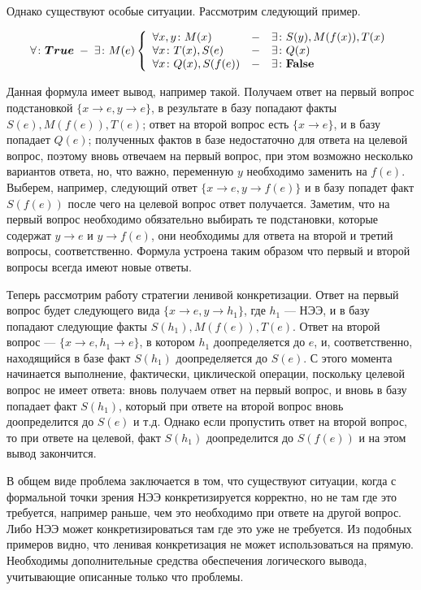 Однако существуют особые ситуации. Рассмотрим следующий пример.
\begin{example}[]\label{example:uhe1}
$$\forall\colon\boldsymbol{True} \; - \; \exists\colon M(e) \left\{
\begin{array}{lcl}
 \forall x,y\colon M(x) & - & \exists\colon S(y),M(f(x)),T(x) \\
 \forall x \colon T(x),S(e) & - & \exists\colon Q(x) \\
 \forall x \colon Q(x),S(f(e)) & - & \exists\colon\textbf{False}
\end{array}
\right.$$

Данная формула имеет вывод, например такой. Получаем ответ на первый вопрос подстановкой $\{ x\rightarrow e, y\rightarrow e \}$, в результате в базу попадают факты $S(e),M(f(e)),T(e)$; ответ на второй вопрос есть $\{ x \rightarrow e\}$, и в базу попадает $Q(e)$; полученных фактов в базе недостаточно для ответа на целевой вопрос, поэтому вновь отвечаем на первый вопрос, при этом возможно несколько вариантов ответа, но, что важно, переменную $y$ необходимо заменить на $f(e)$. Выберем, например, следующий ответ $\{x \rightarrow e, y \rightarrow f(e) \}$ и в базу попадет факт $S(f(e))$ после чего на целевой вопрос ответ получается. Заметим, что на первый вопрос необходимо обязательно выбирать те подстановки, которые содержат $y \rightarrow e$ и $y \rightarrow f(e)$, они необходимы для ответа на второй и третий вопросы, соответственно. Формула устроена таким образом что первый и второй вопросы всегда имеют новые ответы.

Теперь рассмотрим работу стратегии ленивой конкретизации. Ответ на первый вопрос будет следующего вида $\{ x\rightarrow e, y\rightarrow h_1 \}$, где $h_1$ --- НЭЭ, и в базу попадают следующие факты $S(h_1),M(f(e)),T(e)$. Ответ на второй вопрос --- $\{ x\rightarrow e, h_1\rightarrow e \}$, в котором $h_1$ доопределяется до $e$, и, соответственно, находящийся в базе факт $S(h_1)$ доопределяется до $S(e)$. С этого момента начинается выполнение, фактически, циклической операции, поскольку целевой вопрос не имеет ответа: вновь получаем ответ на первый вопрос, и вновь в базу попадает факт $S(h_1)$, который при ответе на второй вопрос вновь доопределится до $S(e)$ и т.д. Однако если пропустить ответ на второй вопрос, то при ответе на целевой, факт $S(h_1)$ доопределится до $S(f(e))$ и на этом вывод закончится.
\end{example}


В общем виде проблема заключается в том, что существуют ситуации, когда с формальной точки зрения НЭЭ конкретизируется корректно, но не там где это требуется, например раньше, чем это необходимо при ответе на другой вопрос. Либо НЭЭ может конкретизироваться там где это уже не требуется. Из подобных примеров видно, что ленивая конкретизация не может использоваться на прямую. Необходимы дополнительные средства обеспечения логического вывода, учитывающие описанные только что проблемы. 


